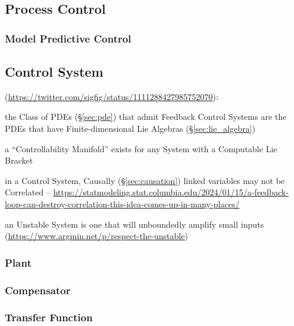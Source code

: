 \subsection{Process Control}\label{sec:process_control}

\subsubsection{Model Predictive Control}\label{sec:model_predictive_control}



\subsection{Control System}\label{sec:control_system}

(\url{https://twitter.com/sigfig/status/1111288427985752070}):

the Class of PDEs (\S\ref{sec:pde}) that admit Feedback Control Systems are the
PDEs that have Finite-dimensional Lie Algebras (\S\ref{sec:lie_algebra})

a ``Controllability Manifold'' exists for any System with a Computable Lie
Bracket

in a Control System, Causally (\S\ref{sec:causation}) linked variables may not
be Correlated --
\url{https://statmodeling.stat.columbia.edu/2024/01/15/a-feedback-loop-can-destroy-correlation-this-idea-comes-up-in-many-places/}

an Unstable System is one that will unboundedly amplify small inputs
(\url{https://www.argmin.net/p/respect-the-unstable})



\subsubsection{Plant}\label{sec:plant}

\subsubsection{Compensator}\label{sec:compensator}

\subsubsection{Transfer Function}\label{sec:transfer_function}

